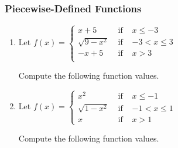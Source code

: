 \documentclass[12pt]{book}
\theoremstyle{definition}
\begin{document}
\subsubsection{Piecewise-Defined Functions}
\begin{enumerate}
\item  Let $f(x) = \left\{  \begin{array}{rcr} x + 5 & \mbox{ if } & x \leq -3 \\ \sqrt{9-x^2} & \mbox{ if } & -3 < x \leq 3 \\ -x+5 & \mbox{ if } & x > 3 \\ \end{array}        \right.$\par
Compute the following function values.

\begin{enumerate}

\end{enumerate}

\item Let ${\displaystyle f(x) = \left\{ \begin{array}{rcr}
x^{2} & \mbox{ if } & x \leq -1\\
\sqrt{1 - x^{2}} & \mbox{ if } & -1 < x \leq 1\\
x & \mbox{ if } & x > 1  \end{array} \right. }$\par
Compute the following function values.

\begin{enumerate}

\end{enumerate}
\end{enumerate}
\end{document}
